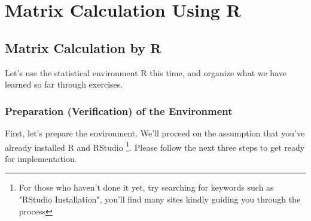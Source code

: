 \documentclass{ltjsbook}
\begin{document}
\chapter{Matrix Calculation Using R}
\label{x09_matrixOnR}
\section{Matrix Calculation by R}

Let's use the statistical environment R this time, and organize what we have learned so far through exercises.
\subsection{Preparation (Verification) of the Environment}
First, let's prepare the environment. We'll proceed on the assumption that you've already installed R and RStudio \footnote{For those who haven't done it yet, try searching for keywords such as "RStudio Installation", you'll find many sites kindly guiding you through the process}. Please follow the next three steps to get ready for implementation.
\end{document}

